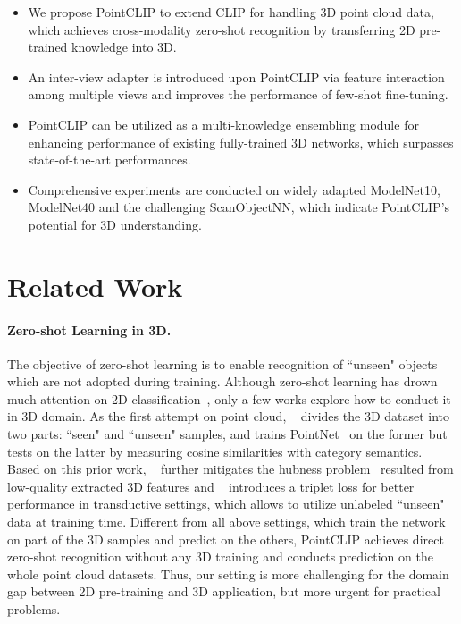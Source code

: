 \documentclass[10pt,twocolumn,letterpaper]{article}
\begin{document}
\begin{itemize}
    \item We propose PointCLIP to extend CLIP for handling 3D point cloud data, which achieves cross-modality zero-shot recognition by transferring 2D pre-trained knowledge into 3D. 
    
    \item An inter-view adapter is introduced upon PointCLIP via feature interaction among multiple views and improves the performance of few-shot fine-tuning. 
    
    \item PointCLIP can be utilized as a multi-knowledge ensembling module for enhancing performance of existing fully-trained 3D networks, which surpasses state-of-the-art performances.
    
    \item Comprehensive experiments are conducted on widely adapted ModelNet10, ModelNet40 and the challenging ScanObjectNN, which indicate PointCLIP's potential for 3D understanding.
\end{itemize}

\section{Related Work}
\label{sec:related work}

\paragraph{Zero-shot Learning in 3D.}
The objective of zero-shot learning is to enable recognition of ``unseen" objects which are not adopted during training. Although zero-shot learning has drown much attention on 2D classification~\cite{radford2021learning,karessli2017gaze,xian2016latent}, only a few works explore how to conduct it in 3D domain. As the first attempt on point cloud, ~\cite{cheraghian2019zero} divides the 3D dataset into two parts: ``seen" and ``unseen" samples, and trains PointNet~\cite{qi2017pointnet} on the former but tests on the latter by measuring cosine similarities with category semantics. 
Based on this prior work, ~\cite{cheraghian2019mitigating} further mitigates the hubness problem~\cite{zhang2017learning} resulted from low-quality extracted 3D features and ~\cite{cheraghian2021zero} introduces a triplet loss for better performance in transductive settings, which allows to utilize unlabeled ``unseen" data at training time. 
Different from all above settings, which train the network on part of the 3D samples and predict on the others, PointCLIP achieves direct zero-shot recognition without any 3D training and conducts prediction on the whole point cloud datasets. Thus, our setting is more challenging for the domain gap between 2D pre-training and 3D application, but more urgent for practical problems.
\end{document}
